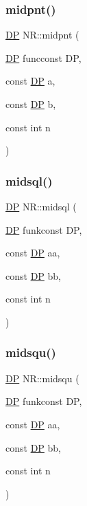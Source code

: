 \mbox{\label{namespaceNR_a0d1a3671e190c043c51cc06aa203ff71}} 
\subsubsection{\texorpdfstring{midpnt()}{midpnt()}}
{\footnotesize\ttfamily \mbox{\hyperlink{namespaceNR_af6ff762dd605ff477b8e52387253a02a}{DP}} N\+R\+::midpnt (\begin{DoxyParamCaption}\item[{\mbox{\hyperlink{namespaceNR_af6ff762dd605ff477b8e52387253a02a}{DP}} }]{funcconst DP,  }\item[{const \mbox{\hyperlink{namespaceNR_af6ff762dd605ff477b8e52387253a02a}{DP}}}]{a,  }\item[{const \mbox{\hyperlink{namespaceNR_af6ff762dd605ff477b8e52387253a02a}{DP}}}]{b,  }\item[{const int}]{n }\end{DoxyParamCaption})}

\mbox{\label{namespaceNR_aacb9dcd500af4cc3a665337679bff722}} 
\subsubsection{\texorpdfstring{midsql()}{midsql()}}
{\footnotesize\ttfamily \mbox{\hyperlink{namespaceNR_af6ff762dd605ff477b8e52387253a02a}{DP}} N\+R\+::midsql (\begin{DoxyParamCaption}\item[{\mbox{\hyperlink{namespaceNR_af6ff762dd605ff477b8e52387253a02a}{DP}} }]{funkconst DP,  }\item[{const \mbox{\hyperlink{namespaceNR_af6ff762dd605ff477b8e52387253a02a}{DP}}}]{aa,  }\item[{const \mbox{\hyperlink{namespaceNR_af6ff762dd605ff477b8e52387253a02a}{DP}}}]{bb,  }\item[{const int}]{n }\end{DoxyParamCaption})}

\mbox{\label{namespaceNR_a24075c7a2564a7ea0d150a535edc65c6}} 
\subsubsection{\texorpdfstring{midsqu()}{midsqu()}}
{\footnotesize\ttfamily \mbox{\hyperlink{namespaceNR_af6ff762dd605ff477b8e52387253a02a}{DP}} N\+R\+::midsqu (\begin{DoxyParamCaption}\item[{\mbox{\hyperlink{namespaceNR_af6ff762dd605ff477b8e52387253a02a}{DP}} }]{funkconst DP,  }\item[{const \mbox{\hyperlink{namespaceNR_af6ff762dd605ff477b8e52387253a02a}{DP}}}]{aa,  }\item[{const \mbox{\hyperlink{namespaceNR_af6ff762dd605ff477b8e52387253a02a}{DP}}}]{bb,  }\item[{const int}]{n }\end{DoxyParamCaption})}


